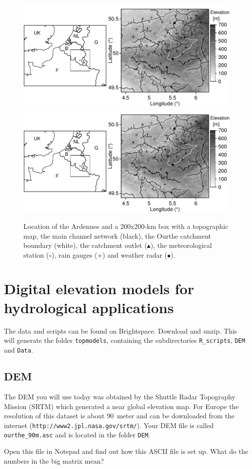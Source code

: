 \documentclass[twocolumn, 10pt, a4paper]{article}
\newenvironment{PC_prac_environment}{
\def\Q{\noindent \color{Gray}\rule[-0.1cm]{\columnwidth}{1.5pt}  \color{black} } \let\ques\Q 
\def\nQ{\noindent \color{black} } \let\ques\nQ 
\def\E{\color{Gray}\rule[0.3cm]{\columnwidth}{1.5pt} \color{black}} \let\ques\E }
\newcommand{\A}[2] { \ifthenelse{\boolean{showanswer}} {\noindent \color{cyan}{#2}\color{black}} {\multido{}{#1}{\noindent \color{light-gray}\hrulefill\\} } }
\begin{document}
\begin{PC_prac_environment}
\begin{figure}
	\centering
	\includegraphics[width=.32\columnwidth, trim=0mm 15mm 100mm 0mm, clip=true]{topomap.pdf}
	\includegraphics[width=.8\columnwidth, trim=68mm 0mm 0mm 0mm, clip=true]{topomap.pdf}
	\caption{Location of the Ardennes and a 200x200-km box with a topographic map, the main channel network (black), the Ourthe catchment boundary (white), the catchment outlet ($\blacktriangle$), the meteorological station ($\circ$), rain gauges (+) and weather radar ($\bullet$).}
	\label{fig:f1}
\end{figure}

\section{Digital elevation models for hydrological applications}
The data and scripts can be found on Brightspace. Download and unzip. This will generate the folder \verb!topmodels!, containing the subdirectories \verb!R_scripts!, \texttt{DEM} and \texttt{Data}. 

\subsection{DEM}
The DEM you will use today was obtained by the Shuttle Radar Topography Mission (SRTM) which generated a near global elevation map. For Europe the resolution of this dataset is about 90~meter and can be downloaded from the internet (\verb!http://www2.jpl.nasa.gov/srtm/!). Your DEM file is called \verb!ourthe_90m.asc! and is located in the folder \texttt{DEM}. 

\newpage
\Q Open this file in Notepad and find out how this ASCII file is set up. What do the numbers in the big matrix mean?\\
\E


\end{PC_prac_environment}
\end{document}
